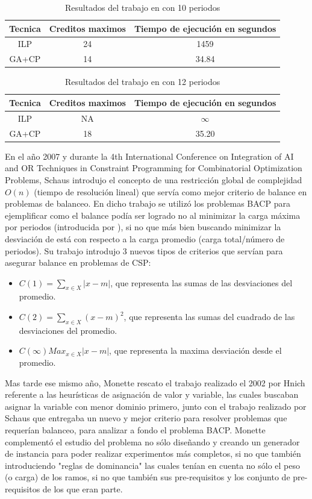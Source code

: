 \documentclass[letter, 10pt]{article}
\begin{document}
\begin{table}[h]
\centering
\caption{Resultados del trabajo en \cite{lambert2006solving} con 10 periodos}
\begin{tabular}{|c|c|c|}
\hline 
Tecnica & Creditos maximos & Tiempo de ejecución en segundos\tabularnewline
\hline 
\hline 
ILP & 24 & 1459\tabularnewline
\hline 
GA+CP & 14 & 34.84\tabularnewline
\hline 
\end{tabular}
\end{table}

\begin{table}[h!]
\centering
\caption{Resultados del trabajo en \cite{lambert2006solving} con 12 periodos}
\begin{tabular}{|c|c|c|}
\hline 
Tecnica & Creditos maximos & Tiempo de ejecución en segundos\tabularnewline
\hline 
\hline 
ILP & NA & $\infty$\tabularnewline
\hline 
GA+CP & 18 & 35.20\tabularnewline
\hline 
\end{tabular}
\end{table}



En el año 2007 y durante la 4th International Conference on Integration
of AI and OR Techniques in Constraint Programming for Combinatorial
Optimization Problems, Schaus\cite{schaus2007deviation} introdujo el
concepto de una restricción global de complejidad $O(n)$ (tiempo de
resolución lineal) que servía como mejor criterio de balance en
problemas de balanceo. En dicho trabajo se utilizó los problemas BACP
para ejemplificar como el balance podía ser logrado no al minimizar la
carga máxima por periodos (introducida por \cite{castro2001variable}),
si no que más bien buscando minimizar la desviación de está con respecto
a la carga promedio (carga total/número de periodos). Su trabajo
introdujo 3 nuevos tipos de criterios que servían para asegurar balance
en problemas de CSP:

\begin{itemize}
\item $C(1)=\sum_{x \in X}{|x-m|}$, que representa las sumas de las
  desviaciones del promedio.
\item $C(2)=\sum_{x \in X}{(x-m)^{2}}$, que representa las sumas del cuadrado de las
  desviaciones del promedio.
\item $C(\infty)Max_{x \in X}{|x-m|}$, que representa la maxima
  desviación desde el promedio.
\end{itemize}

Mas tarde ese mismo año, Monette\cite{monette2007cp} rescato el trabajo
realizado el 2002 por Hnich referente a las heurísticas de asignación de
valor y variable, las cuales buscaban asignar la variable con menor
dominio primero, junto con el trabajo realizado por Schaus que entregaba
un nuevo y mejor criterio para resolver problemas que requerían
balanceo, para analizar a fondo el problema BACP. Monette complementó el
estudio del problema no sólo diseñando y creando un generador de
instancia para poder realizar experimentos más completos, si no que
también introduciendo "reglas de dominancia" las cuales tenían en cuenta
no sólo el peso (o carga) de los ramos, si no que también sus
pre-requisitos y los conjunto de pre-requisitos de los que eran
parte. 
\end{document}
